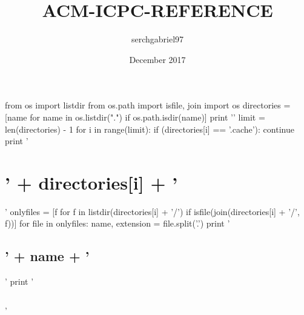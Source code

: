 \documentclass{article}
\title{ACM-ICPC-REFERENCE}
\author{serchgabriel97 }
\date{December 2017}
\begin{document}
\maketitle
\newpage

\begin{multicols*}{2}
\tableofcontents
\newpage
\begin{python}
from os import listdir
from os.path import isfile, join
import os
directories = [name for name in os.listdir(".") if os.path.isdir(name)]
print '\n'
limit = len(directories) - 1
for i in range(limit):
    if (directories[i] == '.cache'):
        continue
    print '\section{' + directories[i] + '}'
    onlyfiles = [f for f in listdir(directories[i] + '/') if isfile(join(directories[i] + '/', f))]
    for file in onlyfiles:
        name, extension = file.split('.')
        print '\subsection{' + name + '}'
        print '\inputminted[breaklines]{' + extension + '}{' + directories[i] + '/' + file + '}'
\end{python}%
\end{multicols*}
\end{document}
